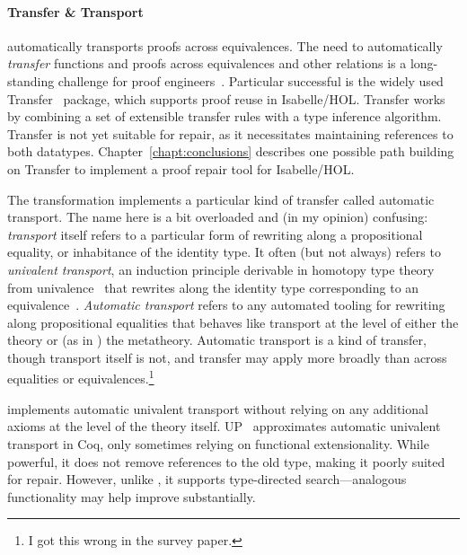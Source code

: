 \paragraph{Transfer \& Transport}
\toolnamec automatically transports proofs across equivalences.
The need to automatically \textit{transfer} functions and proofs across equivalences and other relations is a long-standing challenge for proof 
engineers~\cite{magaud2000changing, Barthe2001, magaud2003changing}.
Particular successful is the widely used Transfer~\cite{Huffman2013} package, which supports proof reuse in Isabelle/HOL. %
Transfer works by combining a set of extensible transfer rules with a type inference algorithm.
Transfer is not yet suitable for repair, as it necessitates maintaining references to both datatypes.
Chapter~\ref{chapt:conclusions} describes one possible path building on Transfer to implement a proof repair tool for Isabelle/HOL.

The \toolnamec transformation implements a particular kind of transfer called automatic transport.
The name here is a bit overloaded and (in my opinion) confusing: \textit{transport} itself refers to a particular form of 
rewriting along a propositional equality, or inhabitance of the identity type.
It often (but not always) refers to \textit{univalent transport}, an induction principle derivable
in homotopy type theory from univalence~\cite{univalent2013homotopy}
that rewrites along the identity type corresponding to an equivalence~\cite{escardo2018self}.
\textit{Automatic transport} refers to any automated tooling for rewriting along propositional equalities
that behaves like transport at the level of either the theory or (as in \toolnamec) the metatheory.
Automatic transport is a kind of transfer, though transport itself is not,
and transfer may apply more broadly than across equalities or equivalences.\footnote{I got this wrong in the survey paper.}

\toolnamec implements automatic univalent transport without relying on any additional axioms at the level of the theory itself.
UP~\cite{tabareau2017equivalences} approximates automatic univalent transport
in Coq, only sometimes relying on functional extensionality.
While powerful, it does not remove references to the old type, making it poorly suited for repair.
However, unlike \toolnamec, it supports type-directed search---analogous functionality
may help improve \toolnamec substantially.

